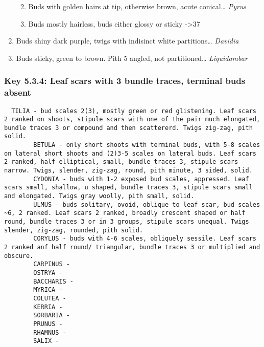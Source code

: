 \documentclass[openany]{book}
\providecommand{\tightlist}{%
  \setlength{\itemsep}{0pt}\setlength{\parskip}{0pt}}
\begin{document}
\begin{enumerate}
  \begin{enumerate}
  \def\labelenumii{\arabic{enumii}.}
  \setcounter{enumii}{34}
  \tightlist
  \item
    Buds with golden hairs at tip, otherwise brown, acute
    conical\ldots{} \emph{Pyrus}
  \item
    Buds mostly hairless, buds either glossy or sticky -\textgreater{}37
  \end{enumerate}
\item
  Buds shiny dark purple, twigs with indisinct white partitions\ldots{}
  \emph{Davidia}\\
\item
  Buds sticky, green to brown. Pith 5 angled, not partitioned\ldots{}
  \emph{Liquidambar}
\end{enumerate}

\hypertarget{key-5.3.4-leaf-scars-with-3-bundle-traces-terminal-buds-absent}{%
\subsubsection{Key 5.3.4: Leaf scars with 3 bundle traces, terminal buds
absent}\label{key-5.3.4-leaf-scars-with-3-bundle-traces-terminal-buds-absent}}

\begin{verbatim}
  TILIA - bud scales 2(3), mostly green or red glistening. Leaf scars 2 ranked on shoots, stipule scars with one of the pair much elongated, bundle traces 3 or compound and then scattererd. Twigs zig-zag, pith solid.
        BETULA - only short shoots with terminal buds, with 5-8 scales on lateral short shoots and (2)3-5 scales on lateral buds. Leaf scars 2 ranked, half elliptical, small, bundle traces 3, stipule scars narrow. Twigs, slender, zig-zag, round, pith minute, 3 sided, solid.
        CYDONIA - buds with 1-2 exposed bud scales, appressed. Leaf scars small, shallow, u shaped, bundle traces 3, stipule scars small and elongated. Twigs gray woolly, pith small, solid.
        ULMUS - buds solitary, ovoid, oblique to leaf scar, bud scales ~6, 2 ranked. Leaf scars 2 ranked, broadly crescent shaped or half round, bundle traces 3 or in 3 groups, stipule scars unequal. Twigs slender, zig-zag, rounded, pith solid.
        CORYLUS - buds with 4-6 scales, obliquely sessile. Leaf scars 2 ranked anf half round/ triangular, bundle traces 3 or multiplied and obscure. 
        CARPINUS -
        OSTRYA -
        BACCHARIS -
        MYRICA -
        COLUTEA -
        KERRIA -
        SORBARIA -
        PRUNUS -
        RHAMNUS -
        SALIX -
    
\end{verbatim}
\end{document}
